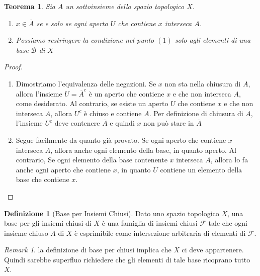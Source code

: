 \documentclass[10pt,a4paper]{article}
\theoremstyle{definition}
\newtheorem{defi}{Definizione}
\theoremstyle{plain}
\newtheorem{teo}{Teorema}
\theoremstyle{remark}
\newtheorem{rem}{Remark}
\theoremstyle{remark}
\newcommand{\B}{\mathcal{B}}
\newcommand{\F}{\mathcal{F}}
\begin{document}
\begin{teo} Sia $A$ un sottoinsieme dello spazio topologico $X$.
\begin{enumerate}
\item $x \in \overline{A}$ se e solo se ogni aperto $U$ che contiene $x$ interseca $A$.
\item Possiamo restringere la condizione nel punto $(1)$ solo agli elementi di una base $\B$ di $X$
\end{enumerate}
\end{teo}
\begin{proof}
\begin{enumerate}
\item Dimostriamo l'equivalenza delle negazioni. Se $x$ non sta nella chiusura di $A$, allora l'insieme $U= \overline{A}^c$ è un aperto che contiene $x$ e che non interseca $A$, come desiderato. Al contrario, se esiste un aperto $U$ che contiene $x$ e che non interseca $A$, allora $U^c$ è chiuso e contiene $A$. Per definizione di chiusura di $A$, l'insieme $U^c$ deve contenere $\overline{A}$ e quindi $x$ non può stare in $\overline{A}$
\item Segue facilmente da quanto già provato. Se ogni aperto che contiene $x$  interseca $A$, allora anche ogni elemento della base, in quanto aperto. Al contrario, Se ogni elemento della base contenente $x$ interseca $A$, allora lo fa anche ogni aperto che contiene $x$, in quanto $U$ contiene un elemento della base che contiene $x$.
\end{enumerate}
\end{proof}

\begin{defi}[Base per Insiemi Chiusi] Dato uno spazio topologico $X$, una base per gli insiemi chiusi di $X$ è una famiglia di insiemi chiusi $\F$ tale che ogni insieme chiuso $A$ di $X$ è esprimibile come intersezione arbitraria di elementi di $\F$.
\end{defi}

\begin{rem} la definizione di base per chiusi implica che $X$ ci deve appartenere. Quindi sarebbe superfluo richiedere che gli elementi di tale base ricoprano tutto $X$.
\end{rem}
\end{document}
